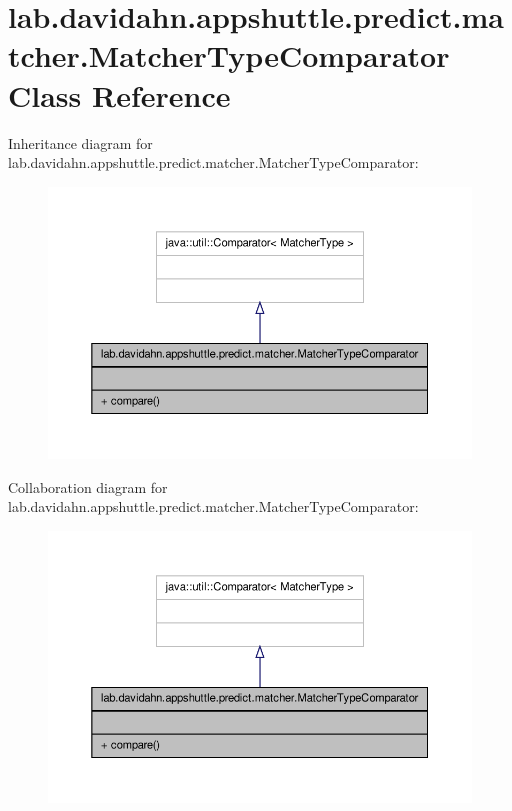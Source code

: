 \hypertarget{classlab_1_1davidahn_1_1appshuttle_1_1predict_1_1matcher_1_1_matcher_type_comparator}{\section{lab.\-davidahn.\-appshuttle.\-predict.\-matcher.\-Matcher\-Type\-Comparator \-Class \-Reference}
\label{classlab_1_1davidahn_1_1appshuttle_1_1predict_1_1matcher_1_1_matcher_type_comparator}
}


\-Inheritance diagram for lab.\-davidahn.\-appshuttle.\-predict.\-matcher.\-Matcher\-Type\-Comparator\-:
\nopagebreak
\begin{figure}[H]
\begin{center}
\leavevmode
\includegraphics[width=350pt]{classlab_1_1davidahn_1_1appshuttle_1_1predict_1_1matcher_1_1_matcher_type_comparator__inherit__graph}
\end{center}
\end{figure}


\-Collaboration diagram for lab.\-davidahn.\-appshuttle.\-predict.\-matcher.\-Matcher\-Type\-Comparator\-:
\nopagebreak
\begin{figure}[H]
\begin{center}
\leavevmode
\includegraphics[width=350pt]{classlab_1_1davidahn_1_1appshuttle_1_1predict_1_1matcher_1_1_matcher_type_comparator__coll__graph}
\end{center}
\end{figure}
